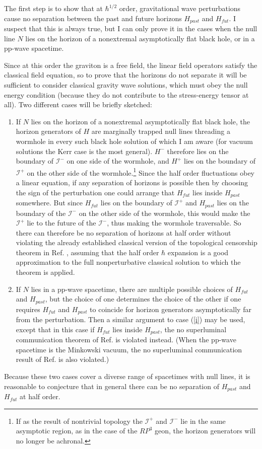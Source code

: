 \documentclass{article}
\begin{document}
The first step is to show that at $\hbar^{1/2}$ order, gravitational wave perturbations cause no separation between the past and future horizons $H_{past}$ and $H_{fut}$.  I suspect that this is always true, but I can only prove it in the cases when the null line $N$ lies on the horizon of a nonextremal asymptotically flat black hole, or in a pp-wave spacetime.

Since at this order the graviton is a free field, the linear field operators satisfy the classical field equation, so to prove that the horizons do not separate it will be sufficient to consider classical gravity wave solutions, which must obey the null energy condition (because they do not contribute to the stress-energy tensor at all).  Two different cases will be briefly sketched:
\begin{enumerate}
\item \label{i} If $N$ lies on the horizon of a nonextremal asymptotically flat black hole, the horizon generators of $H$ are marginally trapped null lines threading a wormhole in every such black hole solution of which I am aware (for vacuum solutions the Kerr case is the most general).  $H^-$ therefore lies on the boundary of $\mathcal{I}^-$ on one side of the wormhole, and $H^+$ lies on the boundary of $\mathcal{I}^+$ on the other side of the wormhole.\footnote{If as the result of nontrivial topology the $\mathcal{I}^+$ and $\mathcal{I}^-$ lie in the same asymptotic region, as in the case of the $RP^3$ geon, the horizon generators will no longer be achronal.}  Since the half order fluctuations obey a linear equation, if any separation of horizons is possible then by choosing the sign of the perturbation one could arrange that $H_{fut}$ lies inside $H_{past}$ somewhere.  But since $H_{fut}$ lies on the boundary of $\mathcal{I}^+$ and $H_{past}$ lies on the boundary of the $\mathcal{I}^-$ on the other side of the wormhole, this would make the $\mathcal{I}^+$ lie to the future of the $\mathcal{I}^-$, thus making the wormhole traversable.  So there can therefore be no separation of horizons at half order without violating the already established classical version of the topological censorship theorem in Ref. \cite{FSW93}, assuming that the half order $\hbar$ expansion is a good approximation to the full nonperturbative classical solution to which the theorem is applied.

\item If $N$ lies in a pp-wave spacetime, there are multiple possible choices of $H_{fut}$ and $H_{past}$, but the choice of one determines the choice of the other if one requires $H_{fut}$ and $H_{past}$ to coincide for horizon generators asymptotically far from the perturbation.  Then a similar argument to case (\ref{i}) may be used, except that in this case if $H_{fut}$ lies inside $H_{past}$, the no superluminal communication theorem of Ref. \cite{olum98} is violated instead.  (When the pp-wave spacetime is the Minkowski vacuum, the no superluminal communication result of Ref. \cite{VBL99} is also violated.)
\end{enumerate}
Because these two cases cover a diverse range of spacetimes with null lines, it is reasonable to conjecture that in general there can be no separation of $H_{past}$ and $H_{fut}$ at half order.
\end{document}
